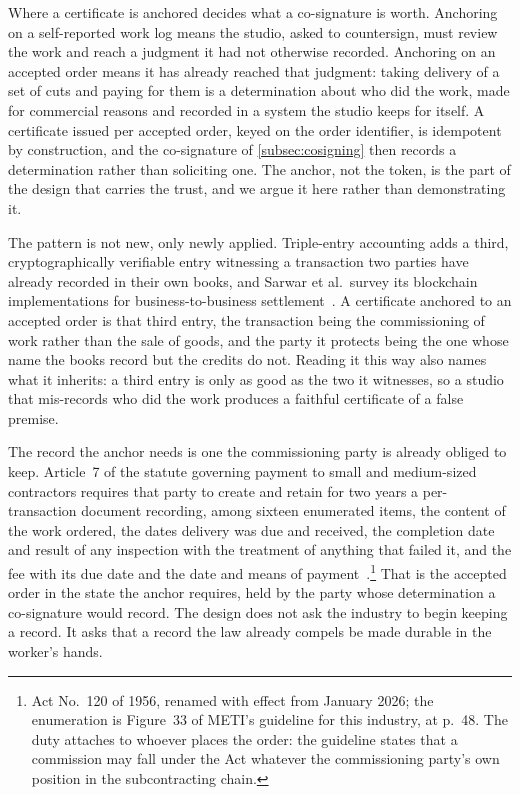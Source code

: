Where a certificate is anchored decides what a co-signature is worth. Anchoring on a
self-reported work log means the studio, asked to countersign, must review the work and
reach a judgment it had not otherwise recorded. Anchoring on an accepted order means it
has already reached that judgment: taking delivery of a set of cuts and paying for them is
a determination about who did the work, made for commercial reasons and recorded in a
system the studio keeps for itself. A certificate issued per accepted order, keyed on the
order identifier, is idempotent by construction, and the co-signature of
\cref{subsec:cosigning} then records a determination rather than soliciting one. The
anchor, not the token, is the part of the design that carries the trust, and we argue it
here rather than demonstrating it.

The pattern is not new, only newly applied. Triple-entry accounting adds a third,
cryptographically verifiable entry witnessing a transaction two parties have already
recorded in their own books, and Sarwar et al.\ survey its blockchain implementations for
business-to-business settlement~\cite{sarwar2023tea}. A certificate anchored to an
accepted order is that third entry, the transaction being the commissioning of work
rather than the sale of goods, and the party it protects being the one whose name the
books record but the credits do not. Reading it this way also names what it inherits: a
third entry is only as good as the two it witnesses, so a studio that mis-records who did
the work produces a faithful certificate of a false premise.

The record the anchor needs is one the commissioning party is already obliged to keep.
Article~7 of the statute governing payment to small and medium-sized contractors requires
that party to create and retain for two years a per-transaction document recording, among
sixteen enumerated items, the content of the work ordered, the dates delivery was due and
received, the completion date and result of any inspection with the treatment of anything
that failed it, and the fee with its due date and the date and means of
payment~\cite{meti2026animeguideline}.\footnote{Act No.~120 of 1956, renamed with
effect from January 2026; the enumeration is Figure~33 of METI's guideline for this
industry, at p.~48. The duty attaches to whoever places the order: the guideline states
that a commission may fall under the Act whatever the commissioning party's own
position in the subcontracting chain.} That is the accepted order in the state the
anchor requires, held by the party whose determination a co-signature would record. The
design does not ask the industry to begin keeping a record. It asks that a record the
law already compels be made durable in the worker's hands.

